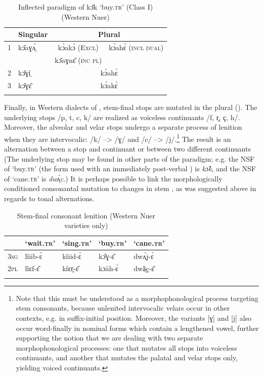 \documentclass[output=paper,newtxmath,modfonts,nonflat]{langsci/langscibook}
\begin{document}
\begin{table}
\begin{tabularx}{\textwidth}{XXXX} 
\lsptoprule
& Singular & \multicolumn{2}{c}{Plural}\\
\midrule
1 & kɔ̌aɣʌ̤́ & \multicolumn{1}{c}{kɔ̀akɔ̀ (\textsc{Excl})} & kɔ̀ahɛ̀ (\textsc{incl dual})\\
  &      &  kɔ̌aɣnɛ̂ (\textsc{inc pl})\\
2 & kɔ̌ɣí̤ & \multicolumn{2}{c}{kɔ̀ahɛ̀}\\
3 & kɔ̌ɣɛ̂ & \multicolumn{2}{c}{kɔ̀akɛ̀}\\
\lspbottomrule
\end{tabularx}
\caption{Inflected paradigm of kɔ̌k ‘buy.\textsc{tr}’ (Class I) (Western Nuer)}
\label{tab:monich:10}
\end{table}

Finally, in Western dialects of , stem-final stops are mutated in the plural (). The underlying stops /p, t, c, k/ are realized as voiceless continuants /f, r̥, ҫ, h/. Moreover, the alveolar and velar stops undergo a separate process of lenition when they are intervocalic: /k/ --> /ɣ/ and /c/ --> /j/.\footnote{Note that this must be understood as a morphophonological process targeting stem consonants, because unlenited intervocalic velars occur in other contexts, e.g. in suffix-initial position. Moreover, the variants [ɣ] and [j] also occur word-finally in nominal forms which contain a lengthened vowel, further supporting the notion that we are dealing with two separate morphophonological  processes: one that mutates all stops into voiceless continuants, and another that mutates the palatal and velar stops only, yielding voiced continuants.} The result is an alternation between a stop and continuant or between two different continuants (The underlying stop may be found in other parts of the paradigm; e.g. the NSF of ‘buy.\textsc{tr}’ (the form used with an immediately post-verbal ) is \textit{kɔ̂k}, and the NSF of ‘cane.\textsc{tr}’ is \textit{dwʌ̤́c}.) It is perhaps possible to link the morphologically conditioned consonantal mutation to changes in stem , as was suggested above in regards to tonal alternations.

\begin{table}
\begin{tabularx}{\textwidth}{XXXXX} 
\lsptoprule
& ‘wait.\textsc{tr}’ & ‘sing.\textsc{tr}’ & ‘buy.\textsc{tr}’ & ‘cane.\textsc{tr}’\\
\midrule
3\textsc{sg} & lîiib-ɛ̀ & kîiid-ɛ̀ & kɔ̌ɣ-ɛ̂ & dwʌ̤́j-ɛ̀\\
2\textsc{pl} & lǐɛf-ɛ̂ & kǐɛr̥-ɛ̂ & kɔàh-ɛ̀ & dwǎ̤ç-ɛ̂\\
\lspbottomrule
\end{tabularx}
\caption{Stem-final consonant lenition (Western Nuer varieties only)}
\label{tab:monich:11}
\end{table}
\end{document}
